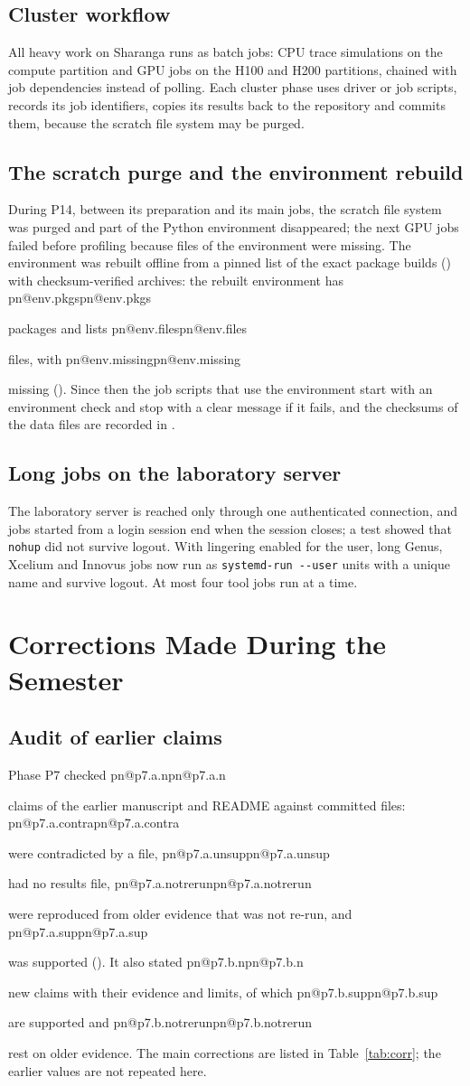 \documentclass[11pt,a4paper]{report}
\makeatletter
\DeclareRobustCommand{\R}[1]{\ifcsname pn@#1\endcsname\csname pn@#1\endcsname\else
  \PackageError{report}{number key '#1' is not defined in macros.tex}{Run tools/make_paper_macros.py --target report}\fi}
\makeatother
\begin{document}
\section{Cluster workflow}
All heavy work on Sharanga runs as batch jobs: CPU trace simulations on the compute partition and GPU jobs on the H100 and H200 partitions, chained with job dependencies instead of polling. Each cluster phase uses driver or job scripts, records its job identifiers, copies its results back to the repository and commits them, because the scratch file system may be
purged.

\section{The scratch purge and the environment rebuild}
During P14, between its preparation and its main jobs, the scratch file system was purged and part of the Python environment disappeared; the next GPU jobs failed before profiling because files of the environment were missing. The environment was rebuilt offline from a
pinned list of the exact package builds () with checksum-verified archives: the
rebuilt environment has \R{env.pkgs} packages and lists \R{env.files} files, with \R{env.missing} missing
(). Since then the job scripts that use the environment start with an environment check and stop with a clear message if it fails, and the checksums of the data files are recorded in .

\section{Long jobs on the laboratory server}
The laboratory server is reached only through one authenticated connection, and jobs started from a login session
end when the session closes; a test showed that \texttt{nohup} did not survive logout. With lingering enabled for the
user, long Genus, Xcelium and Innovus jobs now run as \texttt{systemd-run -{}-user} units with a unique name and
survive logout. At most four tool jobs run at a time.

\chapter{Corrections Made During the Semester}\label{ch:corr}
\section{Audit of earlier claims}
Phase P7 checked \R{p7.a.n} claims of the earlier manuscript and README against committed files: \R{p7.a.contra}
were contradicted by a file, \R{p7.a.unsup} had no results file, \R{p7.a.notrerun} were reproduced from older
evidence that was not re-run, and \R{p7.a.sup} was supported (). It also stated
\R{p7.b.n} new claims with their evidence and limits, of which \R{p7.b.sup} are supported and \R{p7.b.notrerun} rest on
older evidence. The main corrections are listed in Table~\ref{tab:corr}; the earlier values are not repeated here.
\end{document}
